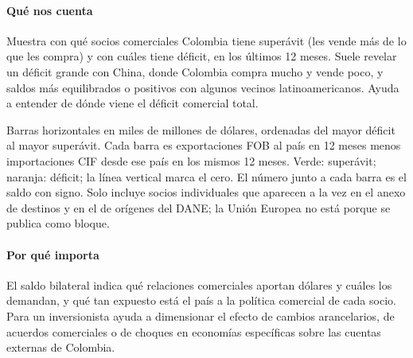 \paragraph{Qué nos cuenta}
Muestra con qué socios comerciales Colombia tiene superávit (les vende más de lo que les compra) y con cuáles tiene déficit, en los últimos 12 meses. Suele revelar un déficit grande con China, donde Colombia compra mucho y vende poco, y saldos más equilibrados o positivos con algunos vecinos latinoamericanos. Ayuda a entender de dónde viene el déficit comercial total.

\begin{leer}
Barras horizontales en miles de millones de dólares, ordenadas del mayor déficit al mayor superávit. Cada barra es exportaciones FOB al país en 12 meses menos importaciones CIF desde ese país en los mismos 12 meses. Verde: superávit; naranja: déficit; la línea vertical marca el cero. El número junto a cada barra es el saldo con signo. Solo incluye socios individuales que aparecen a la vez en el anexo de destinos y en el de orígenes del DANE; la Unión Europea no está porque se publica como bloque.
\end{leer}

\paragraph{Por qué importa}
El saldo bilateral indica qué relaciones comerciales aportan dólares y cuáles los demandan, y qué tan expuesto está el país a la política comercial de cada socio. Para un inversionista ayuda a dimensionar el efecto de cambios arancelarios, de acuerdos comerciales o de choques en economías específicas sobre las cuentas externas de Colombia.

